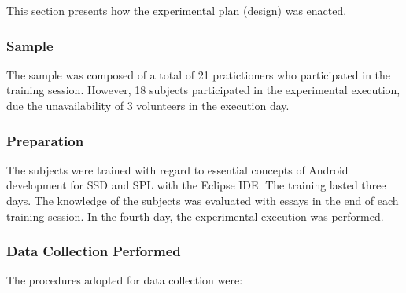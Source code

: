 This section presents how the experimental plan (design) was enacted.

\subsubsection{Sample}

The sample was composed of a total of 21 pratictioners who participated in the training session. However, 18 subjects participated in the experimental execution, due the unavailability of 3 volunteers in the execution day.

\subsubsection{Preparation}

The subjects were trained with regard to essential concepts of Android development for SSD and SPL with the Eclipse IDE. The training lasted three days. The knowledge of the subjects was evaluated with essays in the end of each training session. In the fourth day, the experimental execution was performed.

\subsubsection{Data Collection Performed}

The procedures adopted for data collection were:

